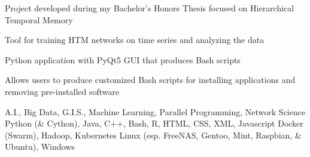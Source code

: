 \documentclass{acmresume}
\begin{document}
		\begin{titemize}
			\item Project developed during my Bachelor's Honors Thesis focused on Hierarchical Temporal Memory
			\item Tool for training HTM networks on time series and analyzing the data
		\end{titemize}
	
        \begin{titemize}
            \item Python application with PyQt5 GUI that produces Bash scripts
            \item Allows users to produce customized Bash scripts for installing applications and removing pre-installed software
        \end{titemize}
    
    
        \begin{description}[topsep=1pt,itemsep=1pt]
             A.I., Big Data, G.I.S., Machine Learning, Parallel Programming, Network Science
             Python (\& Cython), Java, C++, Bash, R, HTML, CSS, XML, Javascript
             Docker (Swarm), Hadoop, Kubernetes
             Linux (esp. FreeNAS, Gentoo, Mint, Raspbian, \& Ubuntu), Windows
        \end{description}

	
\end{document}
